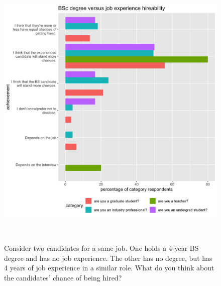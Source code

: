 \documentclass{sigchi}
\begin{document}
\begin{figure}
 \includegraphics[scale=0.2]{../data-analysis/plots_output/BSc_degree_versus_job_experience_hireability.png}
  \caption{Consider two candidates for a same job. One holds a 4-year BS degree and has no job experience. The other has no degree, but has 4 years of job experience in a similar role. What do you think about the candidates' chance of being hired?}~\label{fig:figure6} %
\end{figure}
\end{document}
